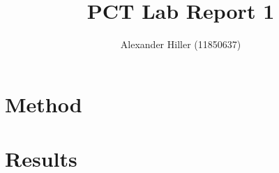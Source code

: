 \documentclass{article}
\begin{document}
\title{PCT Lab Report 1}
\author{Alexander Hiller (11850637)}
\maketitle

\newpage

\tableofcontents

\listoffigures

\newpage

\section{Method}

\section{Results}
\end{document}
